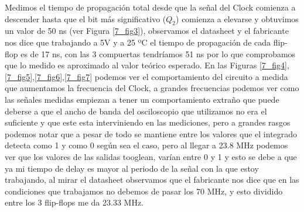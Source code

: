 Medimos el tiempo de propagación total desde que la señal del Clock comienza a descender hasta que el bit más significativo ($Q_2$) comienza a elevarse y obtuvimos un valor de 50 ns (ver Figura \ref{7_fig3}), observamos el datasheet y el fabricante nos dice que trabajando a 5V y a 25 ºC el tiempo de propagación de cada flip-flop es de 17 ns, con las 3 compuertas tendríamos 51 ns por lo que comprobamos que lo medido es aproximado al valor teórico esperado. En las Figuras \ref{7_fig4},\ref{7_fig5},\ref{7_fig6},\ref{7_fig7} podemos ver el comportamiento del circuito a medida que aumentamos la frecuencia del Clock, a grandes frecuencias podemos ver como las señales medidas empiezan a tener un comportamiento extraño que puede deberse a que el ancho de banda del osciloscopio que utilizamos no era el suficiente y que este esta interviniendo en las mediciones, pero a grandes rasgos podemos notar que a pesar de todo se mantiene entre los valores que el integrado detecta como 1 y como 0 según sea el caso, pero al llegar a 23.8 MHz podemos ver que los valores de las salidas tooglean, varían entre 0 y 1 y esto se debe a que ya mi tiempo de delay es mayor al periodo de la señal con la que estoy trabajando, al mirar el datasheet observamos que el fabricante nos dice que en las condiciones que trabajamos no debemos de pasar los 70 MHz, y esto dividido entre los 3 flip-flops me da 23.33 MHz.



